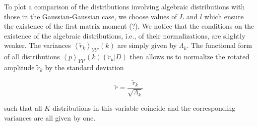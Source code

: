 To plot a comparison of the distributions involving algebraic distributions
with those in the Gaussian-Gaussian case, we choose values of $L$ and $l$ which
ensure the existence of the first matrix moment (?). We notice that the
conditions on the existence of the algebraic distributions, i.e., of their
normalizations, are slightly weaker. The variances $\left\langle \tilde{r}_{k} \right\rangle_{YY'}{\left(k\right)}$
are simply given by $\Lambda_{k}$. The functional form of all distributions
$\left\langle p \right\rangle_{YY'}{\left(k\right)} \left(\tilde{r}_{k} \vert D \right)$
then allows us to normalize the rotated amplitude $\tilde{r}_k$ by the standard
deviation

\begin{equation}
    \tilde{r} = \frac{\tilde{r}_{k}}{\sqrt{\Lambda_{k}}}
\end{equation}

such that all $K$ distributions in this variable coincide and the corresponding
variances are all given by one.